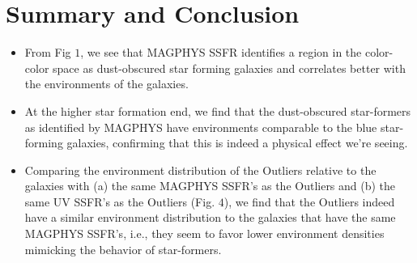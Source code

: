 \documentclass[iop]{emulateapj}
\begin{document}
\section{Summary and Conclusion}


\begin{itemize}
\item{From Fig $1$, we see that MAGPHYS SSFR identifies a region in the color-color space as dust-obscured star forming galaxies and correlates better with the environments of the galaxies.}
\item{At the higher star formation end, we find that the dust-obscured star-formers as identified by MAGPHYS have environments comparable to the blue star-forming galaxies, confirming that this is indeed a physical effect we're seeing.}
\item{Comparing the environment distribution of the Outliers relative to the galaxies with (a) the same MAGPHYS SSFR's as the Outliers and (b) the same UV SSFR's as the Outliers (Fig. $4$), we find that the Outliers indeed have a similar environment distribution to the galaxies that have the same MAGPHYS SSFR's, i.e., they seem to favor lower environment densities mimicking the behavior of star-formers.}
\end{itemize}




%
\end{document}
